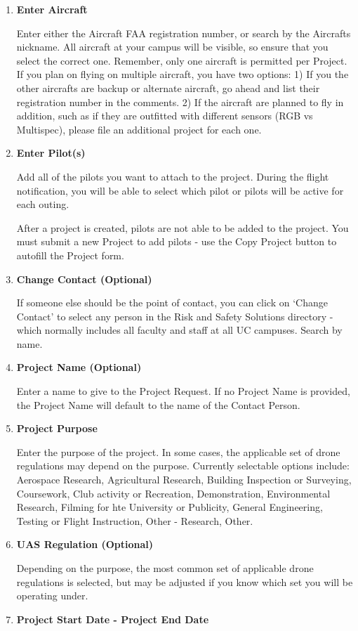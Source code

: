 \documentclass[
  12pt,
]{book}
\begin{document}
\begin{enumerate}
\def\labelenumi{\arabic{enumi}.}
\item
  \textbf{Enter Aircraft}

  Enter either the Aircraft FAA registration number, or search by the Aircrafts nickname. All aircraft at your campus will be visible, so ensure that you select the correct one. Remember, only one aircraft is permitted per Project. If you plan on flying on multiple aircraft, you have two options: 1) If you the other aircrafts are backup or alternate aircraft, go ahead and list their registration number in the comments. 2) If the aircraft are planned to fly in addition, such as if they are outfitted with different sensors (RGB vs Multispec), please file an additional project for each one.
\item
  \textbf{Enter Pilot(s)}

  Add all of the pilots you want to attach to the project. During the flight notification, you will be able to select which pilot or pilots will be active for each outing.

  After a project is created, pilots are not able to be added to the project. You must submit a new Project to add pilots - use the Copy Project button to autofill the Project form.
\item
  \textbf{Change Contact (Optional)}

  If someone else should be the point of contact, you can click on `Change Contact' to select any person in the Risk and Safety Solutions directory - which normally includes all faculty and staff at all UC campuses. Search by name.
\item
  \textbf{Project Name (Optional)}

  Enter a name to give to the Project Request. If no Project Name is provided, the Project Name will default to the name of the Contact Person.
\item
  \textbf{Project Purpose}

  Enter the purpose of the project. In some cases, the applicable set of drone regulations may depend on the purpose. Currently selectable options include: Aerospace Research, Agricultural Research, Building Inspection or Surveying, Coursework, Club activity or Recreation, Demonstration, Environmental Research, Filming for hte University or Publicity, General Engineering, Testing or Flight Instruction, Other - Research, Other.
\item
  \textbf{UAS Regulation (Optional)}

  Depending on the purpose, the most common set of applicable drone regulations is selected, but may be adjusted if you know which set you will be operating under.
\item
  \textbf{Project Start Date - Project End Date}


\end{enumerate}
\end{document}
